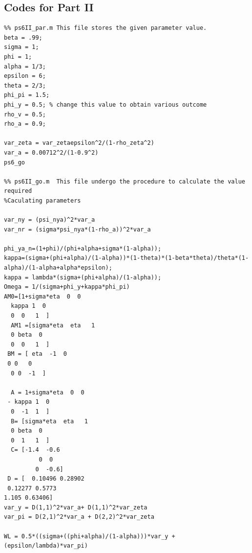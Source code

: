 \documentclass[12pt]{article}
\begin{document}
\subsection{Codes for Part II}
\begin{verbatim}
%% ps6II_par.m This file stores the given parameter value.
beta = .99;
sigma = 1;
phi = 1;
alpha = 1/3;
epsilon = 6;
theta = 2/3;
phi_pi = 1.5;
phi_y = 0.5; % change this value to obtain various outcome
rho_v = 0.5;
rho_a = 0.9;

var_zeta = var_zetaepsilon^2/(1-rho_zeta^2)
var_a = 0.00712^2/(1-0.9^2)
ps6_go

%% ps6II_go.m  This file undergo the procedure to calculate the value required
%Caculating parameters 

var_ny = (psi_nya)^2*var_a
var_nr = (sigma*psi_nya*(1-rho_a))^2*var_a

phi_ya_n=(1+phi)/(phi+alpha+sigma*(1-alpha));
kappa=(sigma+(phi+alpha)/(1-alpha))*(1-theta)*(1-beta*theta)/theta*(1-alpha)/(1-alpha+alpha*epsilon);
kappa = lambda*(sigma+(phi+alpha)/(1-alpha));
Omega = 1/(sigma+phi_y+kappa*phi_pi)
AM0=[1+sigma*eta  0  0  
  kappa 1  0   
  0  0   1  ]
  AM1 =[sigma*eta  eta   1  
  0 beta  0   
  0  0   1  ]
 BM = [ eta  -1  0  
 0 0   0   
  0 0  -1  ]
  
  A = 1+sigma*eta  0  0  
 - kappa 1  0   
  0  -1  1  ]
  B= [sigma*eta  eta   1  
  0 beta  0   
  0  1   1  ]
  C= [-1.4  -0.6 
          0  0   
         0  -0.6]     
 D = [  0.10496 0.28902 
 0.12277 0.5773 
1.105 0.63406]
var_y = D(1,1)^2*var_a+ D(1,1)^2*var_zeta
var_pi = D(2,1)^2*var_a + D(2,2)^2*var_zeta
 
WL = 0.5*((sigma+((phi+alpha)/(1-alpha)))*var_y + (epsilon/lambda)*var_pi)

\end{verbatim}
\end{document}
